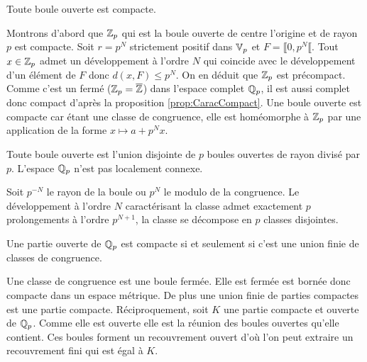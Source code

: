\begin{prop}
 Toute boule ouverte est compacte.
\end{prop}
\begin{demo}
 Montrons d'abord que $\mathbb{Z}_p$ qui est la boule ouverte de centre l'origine et de rayon $p$ est compacte.\newline
 Soit $r = p^N$ strictement positif dans $\mathbb{V}_p$ et $F = \llbracket 0, p^N\llbracket$. Tout $x \in \mathbb{Z}_p$ admet un développement à l'ordre $N$ qui coincide avec le développement d'un élément de $F$ donc $d(x,F)\leq p^N$.\newline
 On en déduit que $\mathbb{Z}_p$ est précompact. Comme c'est un fermé ($\mathbb{Z}_p = \overline{\mathbb{Z}}$) dans l'espace complet $\mathbb{Q}_p$, il est aussi complet donc compact d'après la proposition \ref{prop:CaracCompact}.\newline
 Une boule ouverte est compacte car étant une classe de congruence, elle est homéomorphe à $\mathbb{Z}_p$ par une application de la forme $x \mapsto a + p^N x$.
\end{demo}

\begin{prop}
 Toute boule ouverte est l'union disjointe de $p$ boules ouvertes de rayon divisé par $p$. L'espace $\mathbb{Q}_p$ n'est pas localement connexe.
\end{prop}
\begin{demo}
 Soit $p^{-N}$ le rayon de la boule ou $p^N$ le modulo de la congruence. Le développement à l'ordre $N$ caractérisant la classe admet exactement $p$ prolongements à l'ordre $p^{N+1}$, la classe se décompose en $p$ classes disjointes.
\end{demo}

\begin{propn}\label{prop:OuvertCompactP-adiq}
 Une partie ouverte de $\mathbb{Q}_p$ est compacte si et seulement si c'est une union finie de classes de congruence.
\end{propn}
\begin{demo}
 Une classe de congruence est une boule fermée. Elle est fermée est bornée donc compacte dans un espace métrique. De plus une union finie de parties compactes est une partie compacte.\newline
 Réciproquement, soit $K$ une partie compacte et ouverte de $\mathbb{Q}_p$. Comme elle est ouverte elle est la réunion des boules ouvertes qu'elle contient. Ces boules forment un recouvrement ouvert d'où l'on peut extraire un recouvrement fini qui est égal à $K$.
\end{demo}


